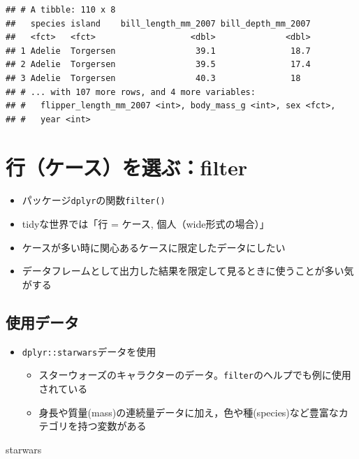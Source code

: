\documentclass[
  xelatex,ja=standard, b5paper]{bxjsbook}
\newenvironment{Shaded}{\begin{snugshade}}{\end{snugshade}}
\newcommand{\NormalTok}[1]{#1}
\providecommand{\tightlist}{%
  \setlength{\itemsep}{0pt}\setlength{\parskip}{0pt}}
\begin{document}
\begin{verbatim}
## # A tibble: 110 x 8
##   species island    bill_length_mm_2007 bill_depth_mm_2007
##   <fct>   <fct>                   <dbl>              <dbl>
## 1 Adelie  Torgersen                39.1               18.7
## 2 Adelie  Torgersen                39.5               17.4
## 3 Adelie  Torgersen                40.3               18  
## # ... with 107 more rows, and 4 more variables:
## #   flipper_length_mm_2007 <int>, body_mass_g <int>, sex <fct>,
## #   year <int>
\end{verbatim}

\hypertarget{filter}{%
\chapter{行（ケース）を選ぶ：filter}\label{filter}}

\begin{itemize}
\tightlist
\item
  パッケージ\texttt{dplyr}の関数\texttt{filter()}
\item
  tidyな世界では「行 = ケース, 個人（wide形式の場合）」
\item
  ケースが多い時に関心あるケースに限定したデータにしたい
\item
  データフレームとして出力した結果を限定して見るときに使うことが多い気がする
\end{itemize}

\hypertarget{ux4f7fux7528ux30c7ux30fcux30bf}{%
\section{使用データ}\label{ux4f7fux7528ux30c7ux30fcux30bf}}

\begin{itemize}
\tightlist
\item
  \texttt{dplyr::starwars}データを使用

  \begin{itemize}
  \tightlist
  \item
    スターウォーズのキャラクターのデータ。\texttt{filter}のヘルプでも例に使用されている
  \item
    身長や質量(mass)の連続量データに加え，色や種(species)など豊富なカテゴリを持つ変数がある
  \end{itemize}
\end{itemize}

\begin{Shaded}
\begin{Highlighting}[]
\NormalTok{starwars}
\end{Highlighting}
\end{Shaded}
\end{document}
